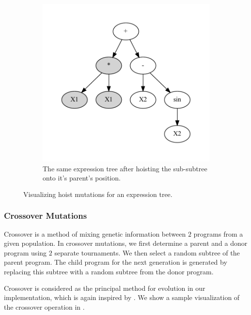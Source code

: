 \begin{figure}[htp]
\begin{subfigure}{\textwidth}
    \includegraphics[scale=0.8]{images/graphviz/hoist_mut_after.dot.pdf}
    \caption{The same expression tree after hoisting the sub-subtree onto it's parent's position.}
    \label{fig:hoist_mutb}
  \end{subfigure}
  \caption{Visualizing hoist mutations for an expression tree. }
  
  \label{fig:hoist}
\end{figure}

\subsubsection{Crossover Mutations}
\label{subsec:crossover}
Crossover is a method of mixing genetic information between $2$ programs from a given population. In crossover mutations, we first determine a parent and a donor program using $2$ separate tournaments. We then select a random subtree of the parent program. The child program for the next generation is generated by replacing this subtree with a random subtree from the donor program. 

Crossover is considered as the principal method for evolution in our implementation, which is again inspired by \citep{gplearn}. We show a sample visualization of the crossover operation in .

